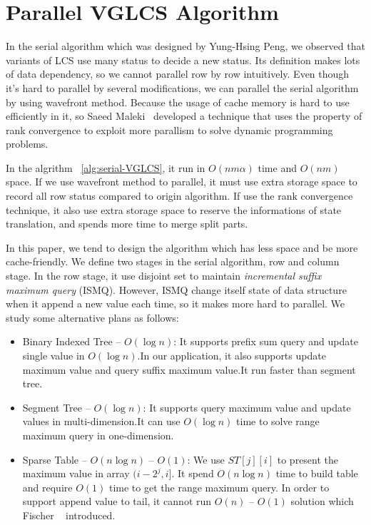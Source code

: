 \section{Parallel VGLCS Algorithm} %
\label{sec:parallelSerial}

In the serial algorithm which was designed by Yung-Hsing Peng, we
observed that variants of LCS use many status to decide a new status.
Its definition makes lots of data dependency, so we cannot parallel
row by row intuitively. Even though it's hard to parallel by several
modifications, we can parallel the serial algorithm by using wavefront
method. Because the usage of cache  memory is hard to use efficiently
in it, so Saeed Maleki~\cite{saeed} developed a technique that uses
the property of rank convergence to exploit more parallism to solve
dynamic programming problems.



In the algrithm ~\ref{alg:serial-VGLCS}, it run in $O(nm \alpha)$ time
and $O(nm)$ space. If we use wavefront method to parallel, it must use
extra storage space to record all row status compared to origin
algorithm. If use the rank convergence technique, it also use extra
storage space to reserve the informations of state translation, and
spends more time to merge split parts.

In this paper, we tend to design the algorithm which has less space
and be more cache-friendly. We define two stages in the serial
algorithm, row and column stage. In the row stage, it use disjoint set
to maintain \emph{incremental suffix maximum query} (ISMQ).  However,
ISMQ change itself state of data structure when it append a new value
each time, so it makes more hard to parallel.  We study some
alternative plans as follows:

\begin{itemize}
  \item 

  Binary Indexed Tree -- $O(\log n)$: It supports prefix sum query and
  update single value in $O(\log n)$.In our application, it also
  supports update maximum value and query suffix maximum value.It run
  faster than segment tree.

  \item 

  Segment Tree -- $O(\log n)$: It supports query maximum value and
  update values in multi-dimension.It can use $O(\log n)$ time to
  solve range maximum query in one-dimension.

  \item 

  Sparse Table -- $O(n \log n)$ -- $O(1)$: We use $ST[j][i]$ to
  present the maximum value in array $(i-2^j,i]$. It spend $O(n \log
  n)$ time to build table and require $O(1)$ time to get the range
  maximum query. In order to support append value to tail, it cannot
  run $O(n)$ -- $O(1)$ solution which Fischer ~\cite{fischer}
  introduced.

\end{itemize}

